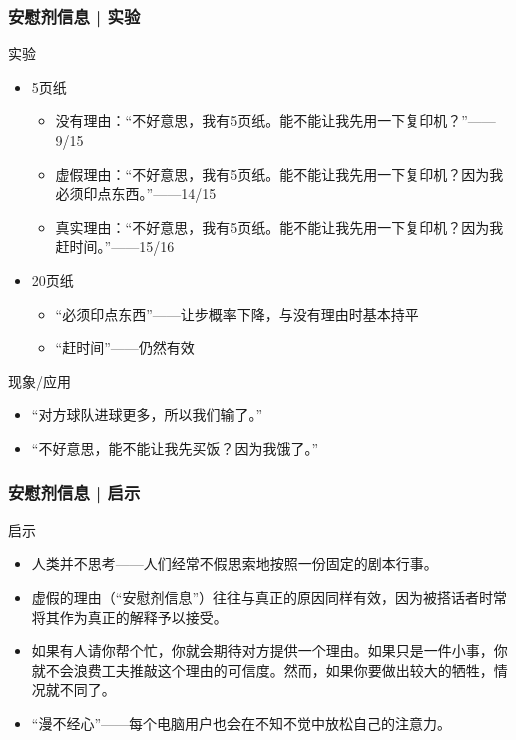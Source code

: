 \begin{frame}
  \frametitle{安慰剂信息 | 实验}
  \begin{block}{实验}
    \begin{itemize}
      \item 5页纸
    \begin{itemize}
      \item 没有理由：“不好意思，我有5页纸。能不能让我先用一下复印机？”——9/15
      \item 虚假理由：“不好意思，我有5页纸。能不能让我先用一下复印机？因为我必须印点东西。”——14/15
      \item 真实理由：“不好意思，我有5页纸。能不能让我先用一下复印机？因为我赶时间。”——15/16
    \end{itemize}
      \item 20页纸
        \begin{itemize}
          \item “必须印点东西”——让步概率下降，与没有理由时基本持平
          \item “赶时间”——仍然有效
        \end{itemize}
    \end{itemize}
  \end{block}
  \pause
  \begin{block}{现象/应用}
    \begin{itemize}
      \item “对方球队进球更多，所以我们输了。”
      \item “不好意思，能不能让我先买饭？因为我饿了。”
    \end{itemize}
  \end{block}
\end{frame}

\begin{frame}
  \frametitle{安慰剂信息 | 启示}
  \begin{block}{启示}
    \begin{itemize}
      \item 人类并不思考——人们经常不假思索地按照一份固定的剧本行事。
      \item \alert{虚假的理由（“安慰剂信息”）往往与真正的原因同样有效}，因为被搭话者时常将其作为真正的解释予以接受。
      \item 如果有人请你帮个忙，你就会期待对方提供一个理由。如果只是一件小事，你就不会浪费工夫推敲这个理由的可信度。然而，如果你要做出较大的牺牲，情况就不同了。
      \item “漫不经心”——每个电脑用户也会在不知不觉中放松自己的注意力。
    \end{itemize}
  \end{block}
\end{frame}


